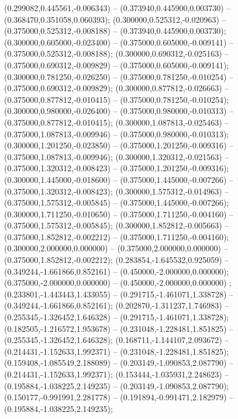  (0.299082,0.445561,-0.006343) -- (0.373940,0.445900,0.003730) -- (0.368470,0.351058,0.060393);
 (0.300000,0.525312,-0.020963) -- (0.375000,0.525312,-0.008188) -- (0.373940,0.445900,0.003730);
 (0.300000,0.605000,-0.023400) -- (0.375000,0.605000,-0.009141) -- (0.375000,0.525312,-0.008188);
 (0.300000,0.690312,-0.025163) -- (0.375000,0.690312,-0.009829) -- (0.375000,0.605000,-0.009141);
 (0.300000,0.781250,-0.026250) -- (0.375000,0.781250,-0.010254) -- (0.375000,0.690312,-0.009829);
 (0.300000,0.877812,-0.026663) -- (0.375000,0.877812,-0.010415) -- (0.375000,0.781250,-0.010254);
 (0.300000,0.980000,-0.026400) -- (0.375000,0.980000,-0.010313) -- (0.375000,0.877812,-0.010415);
 (0.300000,1.087813,-0.025463) -- (0.375000,1.087813,-0.009946) -- (0.375000,0.980000,-0.010313);
 (0.300000,1.201250,-0.023850) -- (0.375000,1.201250,-0.009316) -- (0.375000,1.087813,-0.009946);
 (0.300000,1.320312,-0.021563) -- (0.375000,1.320312,-0.008423) -- (0.375000,1.201250,-0.009316);
 (0.300000,1.445000,-0.018600) -- (0.375000,1.445000,-0.007266) -- (0.375000,1.320312,-0.008423);
 (0.300000,1.575312,-0.014963) -- (0.375000,1.575312,-0.005845) -- (0.375000,1.445000,-0.007266);
 (0.300000,1.711250,-0.010650) -- (0.375000,1.711250,-0.004160) -- (0.375000,1.575312,-0.005845);
 (0.300000,1.852812,-0.005663) -- (0.375000,1.852812,-0.002212) -- (0.375000,1.711250,-0.004160);
 (0.300000,2.000000,0.000000) -- (0.375000,2.000000,0.000000) -- (0.375000,1.852812,-0.002212);
 (0.283854,-1.645532,0.925059) -- (0.349244,-1.661866,0.852161) -- (0.450000,-2.000000,0.000000);
 (0.375000,-2.000000,0.000000) -- (0.450000,-2.000000,0.000000) ;
 (0.233801,-1.443443,1.433055) -- (0.291715,-1.461071,1.338728) -- (0.349244,-1.661866,0.852161);
 (0.202870,-1.311237,1.746983) -- (0.255345,-1.326452,1.646328) -- (0.291715,-1.461071,1.338728);
 (0.182505,-1.216572,1.953678) -- (0.231048,-1.228481,1.851825) -- (0.255345,-1.326452,1.646328);
 (0.168711,-1.144107,2.093672) -- (0.214431,-1.152633,1.992371) -- (0.231048,-1.228481,1.851825);
 (0.159408,-1.085549,2.188089) -- (0.203149,-1.090853,2.087790) -- (0.214431,-1.152633,1.992371);
 (0.153444,-1.035931,2.248623) -- (0.195884,-1.038225,2.149235) -- (0.203149,-1.090853,2.087790);
 (0.150177,-0.991991,2.281778) -- (0.191894,-0.991471,2.182979) -- (0.195884,-1.038225,2.149235);
